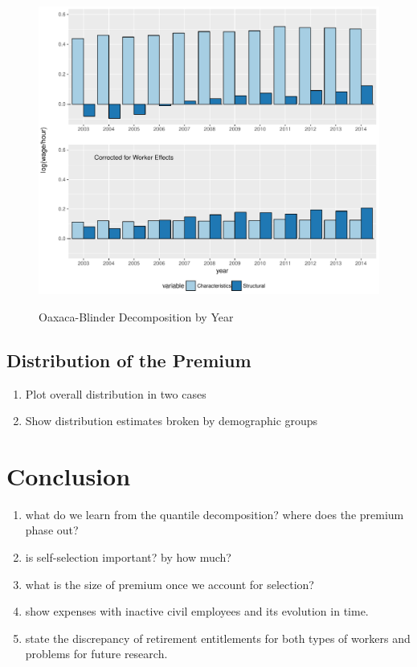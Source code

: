 \documentclass{article}
\begin{document}
\begin{figure}[h!]
    \caption{Oaxaca-Blinder Decomposition by Year}
    \includegraphics[scale=0.65]{graphs/002_yearly_ob_onepc.pdf}
    \label{fig:yearly}
\end{figure}
\subsection{Distribution of the Premium}
\begin{enumerate}
    \item Plot overall distribution in two cases
    \item Show distribution estimates broken by demographic groups
\end{enumerate}

\section{Conclusion}
 \begin{enumerate}
     \item what do we learn from the quantile decomposition? where does the premium phase out?
     \item is self-selection important? by how much?
     \item what is the size of premium once we account for selection?
     \item show expenses with inactive civil employees and its evolution in time.
     \item state the discrepancy of retirement entitlements for both types of workers and problems for future research. 
\end{enumerate}  

\newpage
\scriptsize{}
\end{document}
